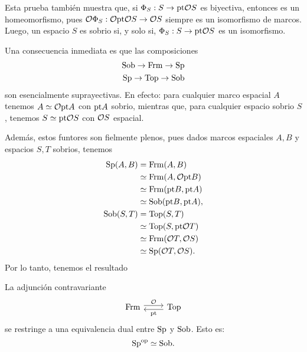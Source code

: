 Esta prueba también muestra que, si $\Phi_S:S\to\pt\cal OS$
es biyectiva, entonces es un homeomorfismo,
pues $\cal O\Phi_S:\cal O\pt\cal OS\to\cal OS$
siempre es un isomorfismo de marcos.
Luego, un espacio $S$ es sobrio si, y solo si,
$\Phi_S:S\to\pt\cal OS$ es un isomorfismo.

Una consecuencia inmediata es que las composiciones
\begin{align*}
    \Sob \to \Frm \to \Sp \\
    \Sp \to \Top \to \Sob
\end{align*}
son esencialmente suprayectivas.
En efecto: para cualquier marco espacial $A$ tenemos
$A\simeq\cal O\pt A$ con $\pt A$ sobrio, mientras que,
para cualquier espacio sobrio $S$, tenemos $S\simeq\pt\cal OS$
con $\cal OS$ espacial.

Además, estos funtores son fielmente plenos, pues dados marcos
espaciales $A,B$ y espacios $S,T$ sobrios, tenemos
\begin{align*}
    \Sp(A,B)
    &= \Frm(A,B) \\
    &\simeq \Frm(A,\cal O\pt B) \\
    &\simeq \Frm(\pt B,\pt A) \\
    &\simeq \Sob(\pt B,\pt A),
    \\
    \Sob(S,T)
    &= \Top(S,T) \\
    &\simeq \Top(S,\pt\cal OT) \\
    &\simeq \Frm(\cal OT,\cal OS) \\
    &\simeq \Sp(\cal OT,\cal OS).
\end{align*}
Por lo tanto, tenemos el resultado
\begin{thm}
    La adjunción contravariante
    \[
        \begin{tikzcd}
            \Frm \ar[r,"\cal O",shift left]
            & \Top \ar[l,"\pt",shift left]
        \end{tikzcd}
    \]
    se restringe a una equivalencia dual entre $\Sp$ y $\Sob$.
    Esto es:
    \[
        \Sp^\op \simeq \Sob.
    \]
\end{thm}

